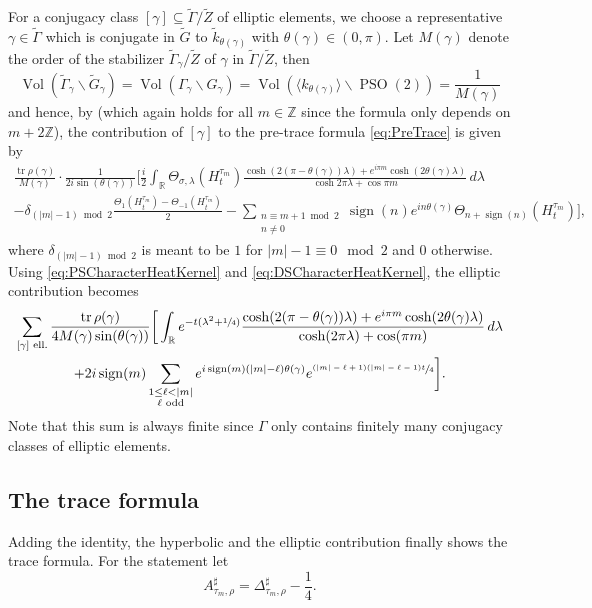 \documentclass[10pt]{amsart}
\theoremstyle{plain}
\theoremstyle{definition}
\theoremstyle{remark}
\newcommand{\R}{\mathbb{R}}
\newcommand{\Z}{\mathbb{Z}}
\DeclareMathOperator{\PSO}{PSO}
\DeclareMathOperator{\tr}{tr}
\DeclareMathOperator{\Vol}{Vol}
\DeclareMathOperator{\sign}{sign}
\numberwithin{equation}{section}
\begin{document}
For a conjugacy class $[\gamma]\subseteq\widetilde{\Gamma}/\widetilde{Z}$ of elliptic ele\-ments, we choose a representative $\gamma\in\widetilde{\Gamma}$ which is conjugate in $\widetilde{G}$ to $\widetilde{k}_{\theta(\gamma)}$ with $\theta(\gamma)\in(0,\pi)$. Let $M(\gamma)$ denote the order of the stabilizer $\widetilde{\Gamma}_\gamma/\widetilde{Z}$ of $\gamma$ in $\widetilde{\Gamma}/\widetilde{Z}$, then
\[
\Vol(\widetilde{\Gamma}_\gamma\backslash\widetilde{G}_\gamma)=\Vol(\Gamma_\gamma\backslash G_\gamma)=\Vol(\langle k_{\theta(\gamma)}\rangle\backslash\PSO(2))=\frac{1}{M(\gamma)}
\]
and hence, by \cite[Lem.\,4]{Hof94} (which again holds for all $m\in\Z$ since the formula only depends on $m+2\Z$), the contribution of $[\gamma]$ to the pre-trace formula \cref{eq:PreTrace} is given by
\begin{multline*}
\frac{\tr\rho(\gamma)}{M(\gamma)}\cdot\frac{1}{2i\sin(\theta(\gamma))}\bigg[\frac{i}{2}\int_\R\Theta_{\sigma,\lambda}(H_t^{\tau_m})\frac{\cosh(2(\pi-\theta(\gamma))\lambda)+e^{i\pi m}\cosh(2\theta(\gamma)\lambda)}{\cosh2\pi\lambda+\cos\pi m}\,d\lambda\\
-\delta_{(|m|-1)\bmod2}\frac{\Theta_1(H_t^{\tau_m})-\Theta_{-1}(H_t^{\tau_m})}{2}
-\sum_{\substack{n\equiv m+1\bmod2\\n\neq0}}\sign(n)e^{in\theta(\gamma)}\Theta_{n+\sign(n)}(H_t^{\tau_m})\bigg],
\end{multline*}
where $\delta_{(|m|-1)\bmod2}$ is meant to be $1$ for $|m|-1\equiv0\mod2$ and $0$ otherwise. Using \cref{eq:PSCharacterHeatKernel} and \cref{eq:DSCharacterHeatKernel}, the elliptic contribution becomes
\begin{multline*}
\sum_{[\gamma]\textup{ ell.}} \frac{\tr\rho(\gamma)}{4M(\gamma)\sin(\theta(\gamma))}\bigg[\int_\R e^{-t(\lambda^2+\sfrac{1}{4})}\frac{\cosh(2(\pi-\theta(\gamma))\lambda)+e^{i\pi m}\cosh(2\theta(\gamma)\lambda)}{\cosh(2\pi\lambda)+\cos(\pi m)}\,d\lambda\\
+2i\sign(m)\sum_{\substack{1\leq\ell<|m|\\\ell\textup{ odd}}}e^{i\sign(m)(|m|-\ell)\theta(\gamma)}e^{\sfrac{(|m|-\ell+1)(|m|-\ell-1)t}{4}}\bigg].
\end{multline*}
Note that this sum is always finite since $\Gamma$ only contains finitely many conjugacy classes of elliptic elements.

\subsection{The trace formula}
\label{subsec:STF}
Adding the identity, the hyperbolic and the elliptic contribution finally shows the trace formula. For the statement let
\[
A_{\tau_m,\rho}^\sharp=\Delta_{\tau_m,\rho}^\sharp-\frac{1}{4}.
\]
\end{document}
